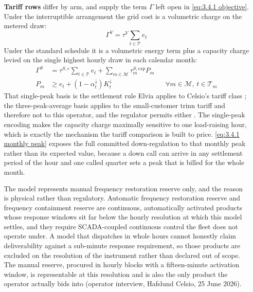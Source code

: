 \textbf{Tariff rows} differ by arm, and supply the term $\Gamma$ left open in \autoref{eq:3.4.1 objective}. Under the interruptible arrangement the grid cost is a volumetric charge on the metered draw:
\begin{equation}
    \Gamma^{V} = \tau^{V} \sum_{t \in \mathcal{T}} e_t \label{eq:3.4.1 tariff V}
\end{equation}
Under the standard schedule it is a volumetric energy term plus a capacity charge levied on the single highest hourly draw in each calendar month:
\begin{align}
    \Gamma^{S} &= \tau^{S,e} \sum_{t \in \mathcal{T}} e_t + \sum_{m \in \mathcal{M}} \tau^{S,\text{cap}}_m P_m \label{eq:3.4.1 tariff S} \\
    P_m &\geq e_t + (1 - \alpha^{\downarrow}_t) K^{\downarrow}_t && \forall m \in \mathcal{M},\ t \in \mathcal{T}_m \label{eq:3.4.1 monthly peak}
\end{align}
That single-peak basis is the settlement rule Elvia applies to Celsio's tariff class \cite{elvia_dagens_2022}; the three-peak-average basis applies to the small-customer trinn tariff and therefore not to this operator, and the regulator permits either \cite{rme_nettleie_2025}. The single-peak encoding makes the capacity charge maximally sensitive to one load-raising hour, which is exactly the mechanism the tariff comparison is built to price. \autoref{eq:3.4.1 monthly peak} exposes the full committed down-regulation to that monthly peak rather than its expected value, because a down call can arrive in any settlement period of the hour and one called quarter sets a peak that is billed for the whole month.

The model represents manual frequency restoration reserve only, and the reason is physical rather than regulatory. Automatic frequency restoration reserve and frequency containment reserve are continuous, automatically activated products whose response windows sit far below the hourly resolution at which this model settles, and they require SCADA-coupled continuous control the fleet does not operate under. A model that dispatches in whole hours cannot honestly claim deliverability against a sub-minute response requirement, so those products are excluded on the resolution of the instrument rather than declared out of scope. The manual reserve, procured in hourly blocks with a fifteen-minute activation window, is representable at this resolution and is also the only product the operator actually bids into (operator interview, Hafslund Celsio, 25 June 2026).

